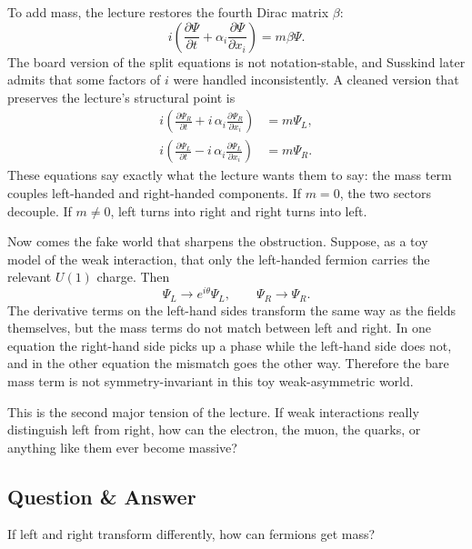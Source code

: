 To add mass, the lecture restores the fourth Dirac matrix \(\beta\):
\begin{equation}
i\left(\frac{\partial \Psi}{\partial t}+\alpha_i\frac{\partial \Psi}{\partial x_i}\right)=m\beta\Psi.
\end{equation}
The board version of the split equations is not notation-stable, and Susskind later admits that some factors of \(i\) were handled inconsistently. A cleaned version that preserves the lecture's structural point is
\begin{align}
i\left(\frac{\partial \Psi_R}{\partial t}+ i\,\alpha_i\frac{\partial \Psi_R}{\partial x_i}\right)&=m\Psi_L,\\
i\left(\frac{\partial \Psi_L}{\partial t}- i\,\alpha_i\frac{\partial \Psi_L}{\partial x_i}\right)&=m\Psi_R.
\end{align}
These equations say exactly what the lecture wants them to say: the mass term couples left-handed and right-handed components. If \(m=0\), the two sectors decouple. If \(m\neq 0\), left turns into right and right turns into left.

Now comes the fake world that sharpens the obstruction. Suppose, as a toy model of the weak interaction, that only the left-handed fermion carries the relevant \(U(1)\) charge. Then
\begin{equation}
\Psi_L \longrightarrow e^{i\theta}\Psi_L,
\qquad
\Psi_R \longrightarrow \Psi_R.
\end{equation}
The derivative terms on the left-hand sides transform the same way as the fields themselves, but the mass terms do not match between left and right. In one equation the right-hand side picks up a phase while the left-hand side does not, and in the other equation the mismatch goes the other way. Therefore the bare mass term is not symmetry-invariant in this toy weak-asymmetric world.

This is the second major tension of the lecture. If weak interactions really distinguish left from right, how can the electron, the muon, the quarks, or anything like them ever become massive?

\subsection{Question \& Answer}

If left and right transform differently, how can fermions get mass?


